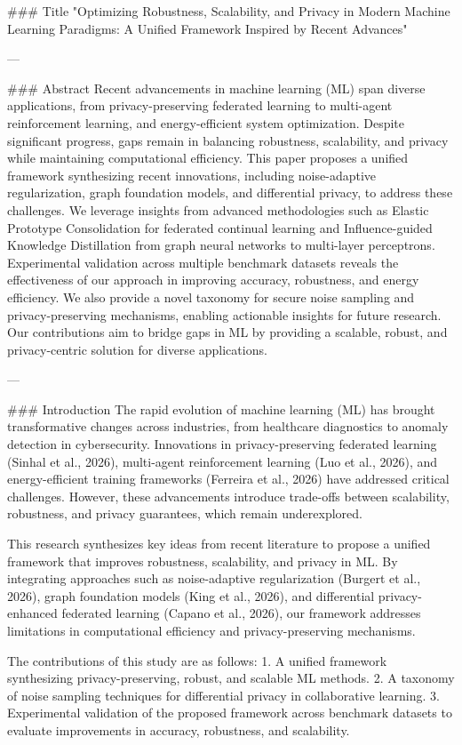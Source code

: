 ### Title
"Optimizing Robustness, Scalability, and Privacy in Modern Machine Learning Paradigms: A Unified Framework Inspired by Recent Advances"

---

### Abstract
Recent advancements in machine learning (ML) span diverse applications, from privacy-preserving federated learning to multi-agent reinforcement learning, and energy-efficient system optimization. Despite significant progress, gaps remain in balancing robustness, scalability, and privacy while maintaining computational efficiency. This paper proposes a unified framework synthesizing recent innovations, including noise-adaptive regularization, graph foundation models, and differential privacy, to address these challenges. We leverage insights from advanced methodologies such as Elastic Prototype Consolidation for federated continual learning and Influence-guided Knowledge Distillation from graph neural networks to multi-layer perceptrons. Experimental validation across multiple benchmark datasets reveals the effectiveness of our approach in improving accuracy, robustness, and energy efficiency. We also provide a novel taxonomy for secure noise sampling and privacy-preserving mechanisms, enabling actionable insights for future research. Our contributions aim to bridge gaps in ML by providing a scalable, robust, and privacy-centric solution for diverse applications.

---

### Introduction
The rapid evolution of machine learning (ML) has brought transformative changes across industries, from healthcare diagnostics to anomaly detection in cybersecurity. Innovations in privacy-preserving federated learning (Sinhal et al., 2026), multi-agent reinforcement learning (Luo et al., 2026), and energy-efficient training frameworks (Ferreira et al., 2026) have addressed critical challenges. However, these advancements introduce trade-offs between scalability, robustness, and privacy guarantees, which remain underexplored.

This research synthesizes key ideas from recent literature to propose a unified framework that improves robustness, scalability, and privacy in ML. By integrating approaches such as noise-adaptive regularization (Burgert et al., 2026), graph foundation models (King et al., 2026), and differential privacy-enhanced federated learning (Capano et al., 2026), our framework addresses limitations in computational efficiency and privacy-preserving mechanisms.

The contributions of this study are as follows:
1. A unified framework synthesizing privacy-preserving, robust, and scalable ML methods.
2. A taxonomy of noise sampling techniques for differential privacy in collaborative learning.
3. Experimental validation of the proposed framework across benchmark datasets to evaluate improvements in accuracy, robustness, and scalability.

